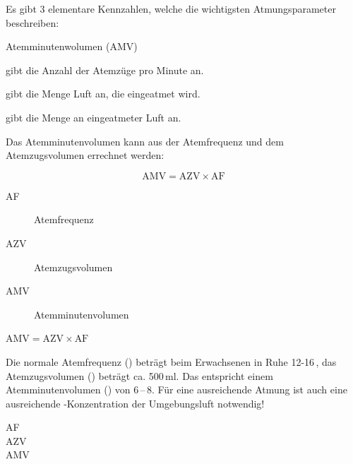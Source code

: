 {

Es gibt 3 elementare Kennzahlen, welche die wichtigsten Atmungsparameter
beschreiben:

\begin{labeling}[\dots{}]{Atemminutenwolumen (AMV)}
  \item[\T{Atemfrequenz} (\T{AF})] gibt die Anzahl der Atemzüge pro
  Minute an.
  \item[\T{Atemzugsvolumen} (\T{AZV})] gibt die Menge
  Luft an, die  eingeatmet wird.
  \item[\T{Atemminutenvolumen} (\T{AMV})] gibt die Menge an 
  eingeatmeter Luft an.
\end{labeling}

Das Atemminutenvolumen kann aus der Atemfrequenz und dem Atemzugsvolumen
errechnet werden: 

\begin{equation}
\mbox{AMV} = \mbox{AZV} \times \mbox{AF}
\end{equation}

}{
\begin{description}
    \item[AF] {\dotfill} Atemfrequenz
    \item[AZV] {\dotfill} Atemzugsvolumen
    \item[AMV] {\dotfill} Atemminutenvolumen
\end{description}

$\mbox{AMV} = \mbox{AZV} \times \mbox{AF}$
}{}{}{}



{
Die normale Atemfrequenz () beträgt beim Erwachsenen
in Ruhe 12-16\,, das Atemzugsvolumen
() beträgt ca. 500\,ml. Das
entspricht einem Atemminutenvolumen () von  6\,--\,8\LMin.  Für eine
ausreichende Atmung ist auch eine ausreichende -Konzentration der
Umgebungsluft notwendig! 
}{
\begin{description}
    \item[AF] {\dotfill} 
    \item[AZV] {\dotfill} 
    \item[AMV] {\dotfill} 
\end{description}
}{}{}{}

